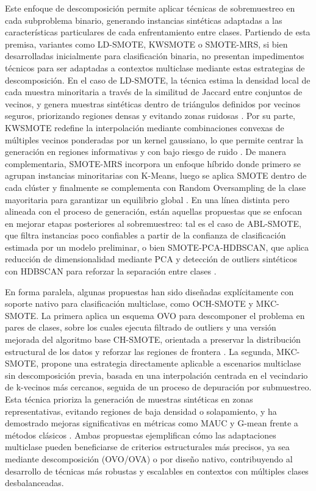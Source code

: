 \documentclass[12pt,a4paper]{article}
\begin{document}
Este enfoque de descomposición permite aplicar técnicas de sobremuestreo en cada subproblema binario, generando instancias sintéticas adaptadas a las características particulares de cada enfrentamiento entre clases. Partiendo de esta premisa, variantes como LD-SMOTE, KWSMOTE o SMOTE-MRS, si bien desarrolladas inicialmente para clasificación binaria, no presentan impedimentos técnicos para ser adaptadas a contextos multiclase mediante estas estrategias de descomposición. En el caso de LD-SMOTE, la técnica estima la densidad local de cada muestra minoritaria a través de la similitud de Jaccard entre conjuntos de vecinos, y genera muestras sintéticas dentro de triángulos definidos por vecinos seguros, priorizando regiones densas y evitando zonas ruidosas \parencite{lyu2025ld}. Por su parte, KWSMOTE redefine la interpolación mediante combinaciones convexas de múltiples vecinos ponderadas por un kernel gaussiano, lo que permite centrar la generación en regiones informativas y con bajo riesgo de ruido \parencite{li2024kwsmote}. De manera complementaria, SMOTE-MRS incorpora un enfoque híbrido donde primero se agrupan instancias minoritarias con K-Means, luego se aplica SMOTE dentro de cada clúster y finalmente se complementa con Random Oversampling de la clase mayoritaria para garantizar un equilibrio global \parencite{saputra2024smotemrs}. En una línea distinta pero alineada con el proceso de generación, están aquellas propuestas que se enfocan en mejorar etapas posteriores al sobremuestreo: tal es el caso de ABL-SMOTE, que filtra instancias poco confiables a partir de la confianza de clasificación estimada por un modelo preliminar, o bien SMOTE-PCA-HDBSCAN, que aplica reducción de dimensionalidad mediante PCA y detección de outliers sintéticos con HDBSCAN para reforzar la separación entre clases \parencite{nasaruddin2025smote}.

En forma paralela, algunas propuestas han sido diseñadas explícitamente con soporte nativo para clasificación multiclase, como OCH-SMOTE y MKC-SMOTE. La primera aplica un esquema OVO para descomponer el problema en pares de clases, sobre los cuales ejecuta filtrado de outliers y una versión mejorada del algoritmo base CH-SMOTE, orientada a preservar la distribución estructural de los datos y reforzar las regiones de frontera \parencite{wang2025aoch}. La segunda, MKC-SMOTE, propone una estrategia directamente aplicable a escenarios multiclase sin descomposición previa, basada en una interpolación centrada en el vecindario de k-vecinos más cercanos, seguida de un proceso de depuración por submuestreo. Esta técnica prioriza la generación de muestras sintéticas en zonas representativas, evitando regiones de baja densidad o solapamiento, y ha demostrado mejoras significativas en métricas como MAUC y G-mean frente a métodos clásicos \parencite{wang2024bmkc}. Ambas propuestas ejemplifican cómo las adaptaciones multiclase pueden beneficiarse de criterios estructurales más precisos, ya sea mediante descomposición (OVO/OVA) o por diseño nativo, contribuyendo al desarrollo de técnicas más robustas y escalables en contextos con múltiples clases desbalanceadas.
\end{document}
